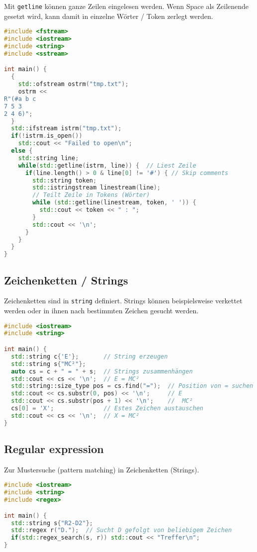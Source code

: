 Mit \lstinline|getline| können ganze Zeilen eingelesen werden. Wenn Space als
Zeilenende gesetzt wird, kann damit in einzelne Wörter / Token zerlegt werden.

\begin{lstlisting}[language=C++]
#include <fstream>
#include <iostream>
#include <string>
#include <sstream>

int main() {
  {
    std::ofstream ostrm("tmp.txt");
    ostrm <<
R"(#a b c
7 5 3
2 4 6)";
  }
  std::ifstream istrm("tmp.txt");
  if(!istrm.is_open())
    std::cout << "Failed to open\n";
  else {
    std::string line;
    while(std::getline(istrm, line)) {  // Liest Zeile
      if(line.length() > 0 & line[0] != '#') { // Skip comments
        std::string token;
        std::istringstream linestream(line);
        // Teilt Zeile in Tokens (Wörter)
        while (std::getline(linestream, token, ' ')) {
          std::cout << token << " : ";
        }
        std::cout << '\n';
      }
    }
  }
}
\end{lstlisting}

\subsection{Zeichenketten / Strings}

Zeichenketten sind in \lstinline|string| definiert. Strings können
beispielsweise verkettet werden oder in ihnen nach bestimmten Zeichen gesucht
werden.

\begin{lstlisting}[language=C++]
#include <iostream>
#include <string>

int main() {
  std::string c{'E'};       // String erzeugen
  std::string s{"MC²"};
  auto cs = c + " = " + s;  // Strings zusammenhängen
  std::cout << cs << '\n';  // E = MC²
  std::string::size_type pos = cs.find("=");  // Position von = suchen
  std::cout << cs.substr(0, pos) << '\n';     // E 
  std::cout << cs.substr(pos + 1) << '\n';    //  MC²
  cs[0] = 'X';              // Estes Zeichen austauschen
  std::cout << cs << '\n';  // X = MC²
}
\end{lstlisting}

\subsection{Regular expression}

Zur Mustersuche (pattern matching) in Zeichenketten (Strings).

\begin{lstlisting}[language=C++]
#include <iostream>
#include <string>
#include <regex>

int main() {
  std::string s{"R2-D2"};
  std::regex r("D.");  // Sucht D gefolgt von beliebigem Zeichen
  if(std::regex_search(s, r)) std::cout << "Treffer\n";
}
\end{lstlisting}


